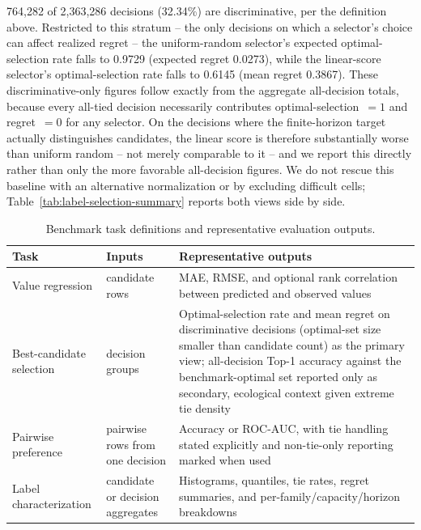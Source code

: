 764,282 of 2,363,286 decisions (32.34\%) are discriminative, per the
definition above. Restricted to
this stratum -- the only decisions on which a selector's choice can
affect realized regret -- the uniform-random selector's expected
optimal-selection rate falls to 0.9729 (expected regret 0.0273), while
the linear-score selector's optimal-selection rate falls to 0.6145 (mean
regret 0.3867). These discriminative-only figures follow exactly from the
aggregate all-decision totals, because every all-tied decision necessarily
contributes optimal-selection~$=1$ and regret~$=0$ for any selector.
On the decisions where the finite-horizon target actually distinguishes
candidates, the linear score is therefore substantially worse than
uniform random -- not merely comparable to it -- and we report this
directly rather than only the more favorable all-decision figures. We do
not rescue this baseline with an alternative normalization or by
excluding difficult cells; Table~\ref{tab:label-selection-summary}
reports both views side by side.







\begin{table}[t]
  \caption{Benchmark task definitions and representative evaluation outputs.}
  \label{tab:task-definitions}
  \centering
  \footnotesize
  \begin{tabularx}{\columnwidth}{@{}P{0.22\columnwidth}P{0.20\columnwidth}L@{}}
    \toprule
    Task & Inputs & Representative outputs \\
    \midrule
    Value regression & candidate rows & MAE, RMSE, and optional rank correlation between predicted and observed values \\
    Best-candidate selection & decision groups & Optimal-selection rate and mean regret on discriminative decisions (optimal-set size smaller than candidate count) as the primary view; all-decision Top-1 accuracy against the benchmark-optimal set reported only as secondary, ecological context given extreme tie density \\
    Pairwise preference & pairwise rows from one decision & Accuracy or ROC-AUC, with tie handling stated explicitly and non-tie-only reporting marked when used \\
    Label characterization & candidate or decision aggregates & Histograms, quantiles, tie rates, regret summaries, and per-family/capacity/horizon breakdowns \\
    \bottomrule
  \end{tabularx}
\end{table}
\FloatBarrier
